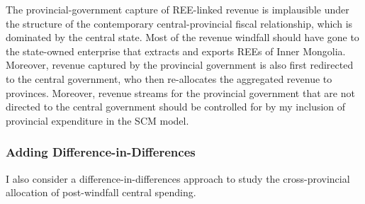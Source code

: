 \documentclass[12pt]{article}
\begin{document}
The provincial-government capture of REE-linked revenue is implausible under the structure of the contemporary central-provincial fiscal relationship, which is dominated by the central state. Most of the revenue windfall should have gone to the state-owned enterprise that extracts and exports REEs of Inner Mongolia. Moreover, revenue captured by the provincial government is also first redirected to the central government, who then re-allocates the aggregated revenue to provinces. Moreover, revenue streams for the provincial government that are not directed to the central government should be controlled for by my inclusion of provincial expenditure in the SCM model.

\subsubsection{Adding Difference-in-Differences}

I also consider a difference-in-differences approach to study the cross-provincial allocation of post-windfall central spending.
\end{document}
